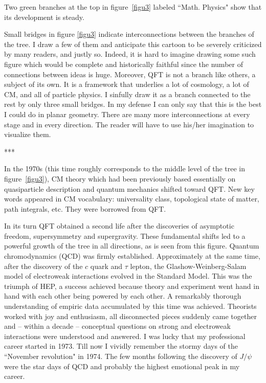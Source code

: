 \documentclass[epsfig,12pt]{article}
\begin{document}
Two green branches at the top in figure~\ref{figu3} labeled ``Math. Physics" show that its development is steady.

Small bridges in figure \ref{figu3} indicate interconnections between the branches of the tree. I draw a few of them and anticipate this cartoon to be severely criticized by many readers, and justly so. Indeed, 
it is hard to imagine drawing some such figure which would be complete and historically faithful since the number of connections between ideas is huge.   
Moreover,  QFT is not a branch like others, a subject of its own. It is a framework that underlies a lot of cosmology, a lot  of CM, and all of particle physics. 
 I sinfully draw it as a branch connected to the rest by only three small bridges. In my defense I can only say that this is the best I could do in planar geometry. There are many more interconnections at every stage and in every direction. The reader will have to use his/her imagination to visualize them.
 
 \vspace{2mm}

\centerline{***}

In the 1970s (this time roughly corresponds to the middle level of the tree in figure~\ref{figu3}), CM theory which  had been  previously based essentially on quasiparticle description and quantum mechanics shifted toward QFT. New key words appeared in CM vocabulary: universality class, topological state of matter, path integrals, etc. They were borrowed from QFT.

In its turn QFT obtained a second life after the discoveries of 
asymptotic freedom,  supersymmetry and supergravity. These fundamental shifts led to a powerful growth of the tree in all directions, as is seen from this figure. Quantum chromodynamics (QCD) was firmly established. Approximately at the same time, after the discovery of the $c$ quark and $\tau$ lepton, the Glashow-Weinberg-Salam model of electroweak interactions evolved in the Standard Model. This was the triumph of HEP, a success achieved because theory and experiment went hand in hand with each other being powered by each other.
A remarkably thorough understanding of empiric data accumulated by this time was achieved. Theorists worked with joy and enthusiasm, all disconnected pieces suddenly came together and -- within a decade -- conceptual questions on strong and electroweak interactions were understood and answered. I was lucky that my professional career started in 1973. Till now I vividly remember the stormy days of the ``November revolution" in 1974. The few months following the discovery of $J/\psi$ were the star days of QCD and probably the highest emotional peak in my career.
\end{document}
